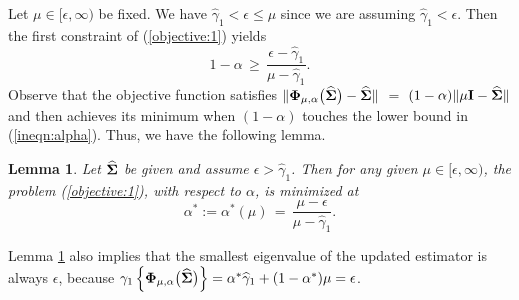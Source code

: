 \documentclass[times,sort&compress,3p]{elsarticle}
\newtheorem{lemma}{Lemma}
\begin{document}
Let  $\mu \in [\epsilon, \infty)$ be fixed. We have $\widehat{\gamma}_{1} < \epsilon \leq \mu$ 
since we are assuming $\widehat{\gamma}_{1} < \epsilon$. Then the first constraint of (\ref{objective:1}) yields
\begin{equation}\label{ineqn:alpha}
 1-\alpha \,\geq\,
 	\frac{\epsilon - \widehat{\gamma}_{1}}{\mu - \widehat{\gamma}_{1}}.
\end{equation}
Observe that the objective function satisfies 
$\| {\bf \Phi}_{\mu, \alpha}\big(\widehat{\bf \Sigma}\big) - \widehat{\bf \Sigma} \|$ $=$ $(1 - \alpha) \| \mu {\bf I} - \widehat{\bf \Sigma} \|$ and then achieves its minimum when $(1-\alpha)$ touches the lower bound in (\ref{ineqn:alpha}).
Thus, we have the following lemma.
%
\begin{lemma}\label{lemma:alpha} Let $\widehat{\bf \Sigma}$ be given and assume $\epsilon > \widehat{\gamma}_{1}$. Then for any given $\mu \in [\epsilon, \infty)$, the problem (\ref{objective:1}), with respect to $\alpha$, is minimized at
\begin{equation}\label{eqn:alpha}
  \alpha^* := \alpha^*(\mu) \,=\,
 	\frac{\mu - \epsilon}{\mu - \widehat{\gamma}_{1}}.
\end{equation}
\end{lemma}
%
\noindent Lemma \ref{lemma:alpha} also implies that the smallest eigenvalue of the updated estimator is always $\epsilon$, because 
$\gamma_1 \left\{ {\bf \Phi}_{\mu, \alpha}\big(\widehat{\bf \Sigma}\big) \right\}
= \alpha^* \widehat{\gamma}_1 + (1 - \alpha^*) \mu = \epsilon$.  %
\end{document}
